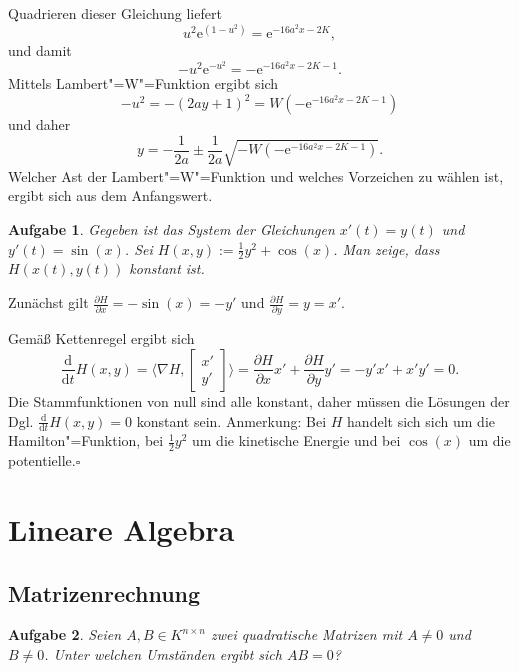 \documentclass[a4paper,10pt,fleqn,twoside]{scrartcl}
\numberwithin{equation}{section}
\newcommand{\ee}{\mathrm e}
\newcommand{\strong}[1]{{\normalfont\sffamily\bfseries #1}}
\renewcommand{\qedsymbol}{\ensuremath{\square}}
\theoremstyle{Aufgabe}
\newtheorem{Aufgabe}{\sffamily Aufgabe}[section]
\begin{document}
Quadrieren dieser Gleichung liefert
\begin{equation}
u^2\ee^{(1-u^2)} = \ee^{-16a^2x-2K},
\end{equation}
und damit
\begin{equation}
-u^2\ee^{-u^2} = -\ee^{-16a^2x-2K-1}.
\end{equation}
Mittels Lambert"=W"=Funktion ergibt sich
\begin{equation}
-u^2 = -(2ay+1)^2 = W(-\ee^{-16a^2x-2K-1})
\end{equation}
und daher
\begin{equation}
y = -\frac{1}{2a}\pm\frac{1}{2a}\sqrt{-W(-\ee^{-16a^2x-2K-1})}.
\end{equation}
Welcher Ast der Lambert"=W"=Funktion und welches Vorzeichen
zu wählen ist, ergibt sich aus dem Anfangswert.

\begin{Aufgabe}
Gegeben ist das System der Gleichungen $x'(t)=y(t)$ und
$y'(t)=\sin(x)$. Sei $H(x,y):=\tfrac{1}{2}y^2+\cos(x)$.
Man zeige, dass $H(x(t),y(t))$ konstant ist.
\end{Aufgabe}

\noindent\strong{Lösung.}
Zunächst gilt $\tfrac{\partial H}{\partial x}=-\sin(x)=-y'$ und
$\tfrac{\partial H}{\partial y}=y=x'$.

Gemäß Kettenregel ergibt sich
\[\frac{\mathrm d}{\mathrm dt}H(x,y)
= \langle\nabla H,\begin{bmatrix}x'\\ y'\end{bmatrix}\rangle
= \frac{\partial H}{\partial x}x'+\frac{\partial H}{\partial y}y'
= -y'x' + x'y' = 0.\]
Die Stammfunktionen von null sind alle konstant, daher müssen die
Lösungen der Dgl. $\frac{\mathrm d}{\mathrm dt}H(x,y)=0$
konstant sein. Anmerkung: Bei $H$ handelt sich sich um die
Hamilton"=Funktion, bei $\tfrac{1}{2}y^2$ um die kinetische Energie
und bei $\cos(x)$ um die potentielle.\;\qedsymbol

\newpage
\section{Lineare Algebra}
\subsection{Matrizenrechnung}
\begin{Aufgabe}
Seien $A,B\in K^{n\times n}$ zwei quadratische Matrizen mit $A\ne 0$
und $B\ne 0$. Unter welchen Umständen ergibt sich $AB=0$?
\end{Aufgabe}
\end{document}

